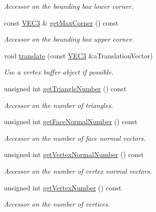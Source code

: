 \begin{DoxyCompactItemize}
\begin{DoxyCompactList}\small\item\em Accessor on the bounding box lower corner. \end{DoxyCompactList}\item 
const \hyperlink{class_math_1_1_vec3}{VEC3} \& \hyperlink{class_graphics_1_1_triangle_mesh_a8194f8e56a60bd0c1f60b653fccd42f7}{getMaxCorner} () const 
\begin{DoxyCompactList}\small\item\em Accessor on the bounding box upper corner. \end{DoxyCompactList}\item 
void \hyperlink{class_graphics_1_1_triangle_mesh_ae7a9b8bfda0e274707bb3af94dfb7971}{translate} (const \hyperlink{class_math_1_1_vec3}{VEC3} \&aTranslationVector)
\begin{DoxyCompactList}\small\item\em Use a vertex buffer object if possible. \end{DoxyCompactList}\item 
unsigned int \hyperlink{class_graphics_1_1_triangle_mesh_a8be06f8a7862b67d4f02fad6b711afd3}{getTriangleNumber} () const 
\begin{DoxyCompactList}\small\item\em Accessor on the number of triangles. \end{DoxyCompactList}\item 
unsigned int \hyperlink{class_graphics_1_1_triangle_mesh_ac08435b3a2b9d2a9b502fa57de34de57}{getFaceNormalNumber} () const 
\begin{DoxyCompactList}\small\item\em Accessor on the number of face normal vectors. \end{DoxyCompactList}\item 
unsigned int \hyperlink{class_graphics_1_1_triangle_mesh_ac7ee1803f7ef0dd7318f976e09d2a3d5}{getVertexNormalNumber} () const 
\begin{DoxyCompactList}\small\item\em Accessor on the number of vertex normal vectors. \end{DoxyCompactList}\item 
unsigned int \hyperlink{class_graphics_1_1_triangle_mesh_ac1906fbc0d9ccffd2605f4966b9f0739}{getVertexNumber} () const 
\begin{DoxyCompactList}\small\item\em Accessor on the number of vertices. \end{DoxyCompactList}\item 

\end{DoxyCompactItemize}
